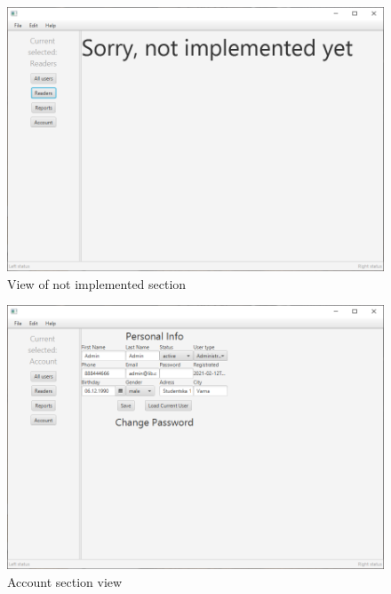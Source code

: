 \begin{figure}[H]
    \centering
    \includegraphics[width=\textwidth]{Include/Resources/FrontendScreens/JavaFX/adminNotImplemented.png}
    \caption{View of not implemented section}
    \label{fig:ScreenshotGUIadminNotImplemented}
\end{figure}




\begin{figure}[H]
    \centering
    \includegraphics[width=\textwidth]{Include/Resources/FrontendScreens/JavaFX/adminAccount.png}
    \caption{Account section view}
    \label{fig:ScreenshotGUIadminAccount}
\end{figure}




